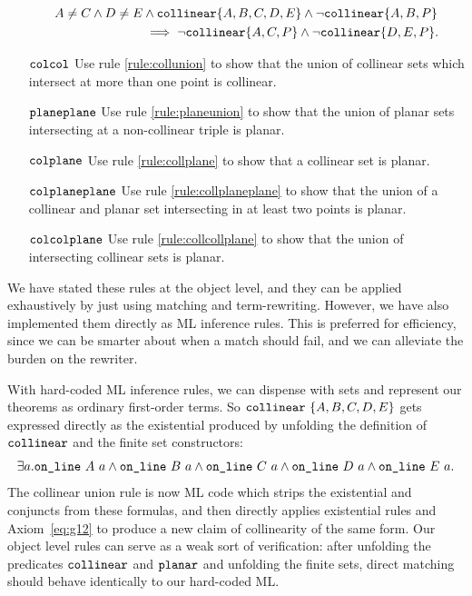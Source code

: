 \begin{itemize}
\begin{align*}
A \neq C \wedge D \neq E &\wedge \texttt{collinear} \{A, B, C, D, E\} \wedge \neg\texttt{collinear} \{A, B, P\}\\
&\implies \neg\texttt{collinear} \{A, C, P\} \wedge \neg\texttt{collinear} \{D, E, P\}.
\end{align*}
\item[$\texttt{colcol}$] Use rule \ref{rule:collunion} to show that the union of collinear sets which intersect at more than one point is collinear.
\item[$\texttt{planeplane}$] Use rule \ref{rule:planeunion} to show that the union of planar sets intersecting at a non-collinear triple is planar.
\item[$\texttt{colplane}$] Use rule \ref{rule:collplane} to show that a collinear set is planar.
\item[$\texttt{colplaneplane}$] Use rule \ref{rule:collplaneplane} to show that the union of a collinear and planar set intersecting in at least two points is planar.
\item[$\texttt{colcolplane}$] Use rule \ref{rule:collcollplane} to show that the union of intersecting collinear sets is planar.
\end{itemize}

We have stated these rules at the object level, and they can be applied exhaustively by just using matching and term-rewriting. However, we have also implemented them directly as ML inference rules. This is preferred for efficiency, since we can be smarter about when a match should fail, and we can alleviate the burden on the rewriter.

With hard-coded ML inference rules, we can dispense with sets and represent our theorems as ordinary first-order terms. So $\texttt{collinear}\ \{A,B,C,D,E\}$ gets expressed directly as the existential produced by unfolding the definition of $\texttt{collinear}$ and the finite set constructors:
\begin{displaymath}
  \exists a. \code{on\_line}\ A\ a\wedge\code{on\_line}\ B\ a\wedge\code{on\_line}\ C\ a\wedge\code{on\_line}\ D\ a\wedge\code{on\_line}\ E\ a.
\end{displaymath}
The collinear union rule is now ML code which strips the existential and conjuncts from these formulas, and then directly applies existential rules and Axiom~\ref{eq:g12} to produce a new claim of collinearity of the same form. Our object level rules can serve as a weak sort of verification: after unfolding the predicates $\texttt{collinear}$ and $\texttt{planar}$ and unfolding the finite sets, direct matching should behave identically to our hard-coded ML.

